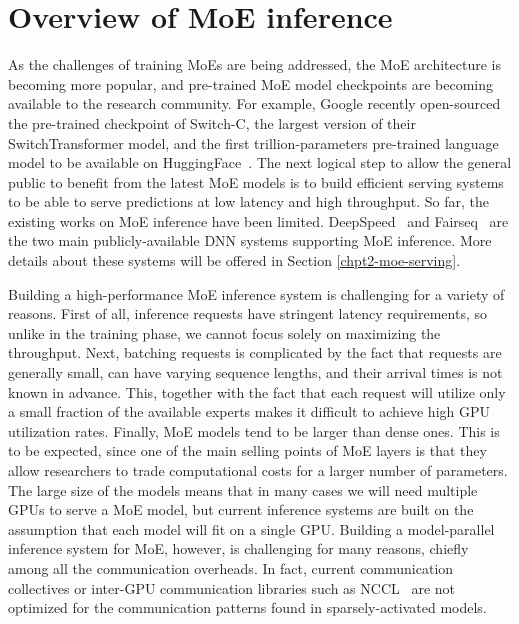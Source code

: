 \section{Overview of MoE inference}
As the challenges of training MoEs are being addressed, the MoE architecture is becoming more popular, and pre-trained MoE model checkpoints are becoming available to the research community. For example, Google recently open-sourced the pre-trained checkpoint of Switch-C, the largest version of their SwitchTransformer model, and the first trillion-parameters pre-trained language model to be available on HuggingFace~\cite{switch_huggingface}. The next logical step to allow the general public to benefit from the latest MoE models is to build efficient serving systems to be able to serve predictions at low latency and high throughput. So far, the existing works on MoE inference have been limited. DeepSpeed~\cite{deepspeed-moe} and Fairseq~\cite{fairseq} are the two main publicly-available DNN systems supporting MoE inference. More details about these systems will be offered in Section \ref{chpt2-moe-serving}.

Building a high-performance MoE inference system is challenging for a variety of reasons. First of all, inference requests have stringent latency requirements, so unlike in the training phase, we cannot focus solely on maximizing the throughput. Next, batching requests is complicated by the fact that requests are generally small, can have varying sequence lengths, and their arrival times is not known in advance. This, together with the fact that each request will utilize only a small fraction of the available experts makes it difficult to achieve high GPU utilization rates. Finally, MoE models tend to be larger than dense ones. This is to be expected, since one of the main selling points of MoE layers is that they allow researchers to trade computational costs for a larger number of parameters. The large size of the models means that in many cases we will need multiple GPUs to serve a MoE model, but current inference systems are built on the assumption that each model will fit on a single GPU. Building a model-parallel inference system for MoE, however, is challenging for many reasons, chiefly among all the communication overheads. In fact, current communication collectives or inter-GPU communication libraries such as NCCL~\cite{nccl} are not optimized for the communication patterns found in sparsely-activated models.

